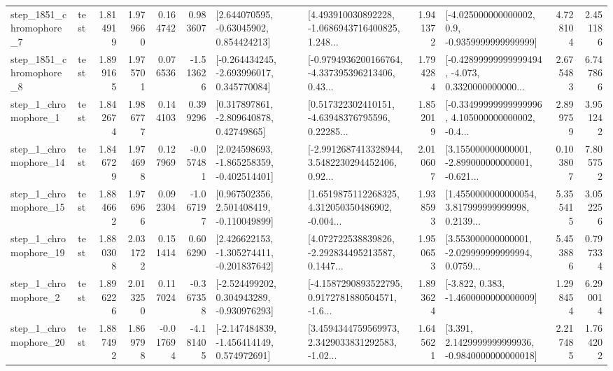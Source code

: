 \begin{tabular}{llrrrrllrlrr}
  step\_1851\_chromophore\_7 &      test &      1.814919 &    1.979660 &      0.164742 &  0.983607 &     [2.644070595, -0.63045902, 0.854424213] &  [4.493910030892228, -1.0686943716400825, 1.248... &       1.941372 &     [-4.025000000000002, 0.9, -0.9359999999999999] &            4.728104 &          2.451186 \\
  step\_1851\_chromophore\_8 &      test &      1.899165 &    1.975701 &      0.076536 & -1.513626 &   [-0.264434245, -2.693996017, 0.345770084] &  [-0.9794936200166764, -4.337395396213406, 0.43... &       1.794284 &  [-0.42899999999999494, -4.073, 0.3320000000000... &            2.675483 &          6.747866 \\
     step\_1\_chromophore\_1 &      test &      1.842674 &    1.986777 &      0.144103 &  0.399296 &     [0.317897861, -2.809640878, 0.42749865] &  [0.517322302410151, -4.63948376795596, 0.22285... &       1.852019 &  [-0.33499999999999996, 4.105000000000002, -0.4... &            2.899759 &          3.951242 \\
    step\_1\_chromophore\_14 &      test &      1.846729 &    1.974698 &      0.127969 & -0.057481 &   [2.024598693, -1.865258359, -0.402514401] &  [-2.9912687413328944, 3.5482230294452406, 0.92... &       2.010607 &  [3.155000000000001, -2.899000000000001, -0.621... &            0.103807 &          7.805752 \\
    step\_1\_chromophore\_15 &      test &      1.884662 &    1.976966 &      0.092304 & -1.067197 &    [0.967502356, 2.501408419, -0.110049899] &  [1.6519875112268325, 4.312050350486902, -0.004... &       1.938593 &  [1.4550000000000054, 3.817999999999998, 0.2139... &            5.355415 &          3.052256 \\
    step\_1\_chromophore\_19 &      test &      1.880308 &    2.031722 &      0.151414 &  0.606290 &   [2.426622153, -1.305274411, -0.201837642] &  [4.072722538839826, -2.292834495213587, 0.1447... &       1.950653 &  [3.553000000000001, -2.029999999999994, 0.0759... &            5.453886 &          0.797334 \\
     step\_1\_chromophore\_2 &      test &      1.896226 &    2.013250 &      0.117024 & -0.367358 &   [-2.524499202, 0.304943289, -0.930976293] &  [-4.1587290893522795, 0.9172781880504571, -1.6... &       1.893624 &               [-3.822, 0.383, -1.4600000000000009] &            1.298454 &          6.290014 \\
    step\_1\_chromophore\_20 &      test &      1.887492 &    1.869798 &     -0.017694 & -4.181405 &   [-2.147484839, -1.456414149, 0.574972691] &  [3.4594344759569973, 2.3429033831292583, -1.02... &       1.645621 &   [3.391, 2.1429999999999936, -0.9840000000000018] &            2.217485 &          1.764202 \\

\end{tabular}

